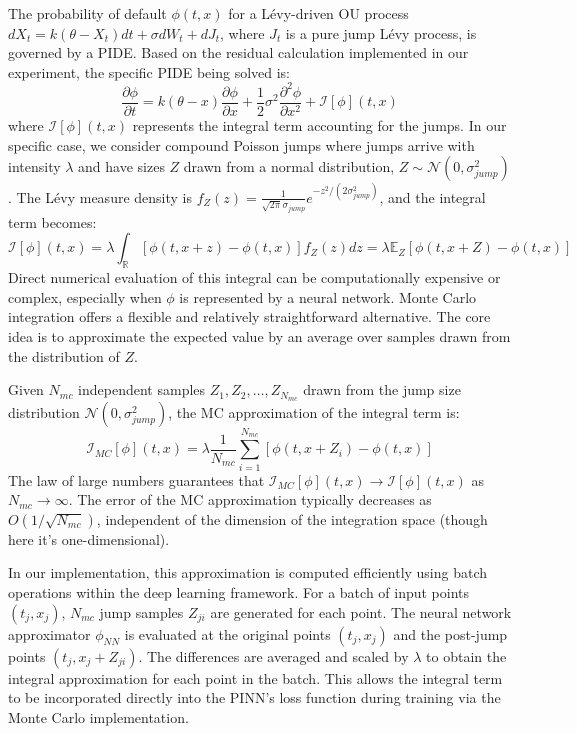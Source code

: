 \documentclass[11pt,twoside,openright]{report}
\begin{document}
The probability of default $\phi(t, x)$ for a Lévy-driven OU process $dX_t = k(\theta - X_t)dt + \sigma dW_t + dJ_t$, where $J_t$ is a pure jump Lévy process, is governed by a PIDE. Based on the residual calculation implemented in our experiment, the specific PIDE being solved is:
$$
\frac{\partial \phi}{\partial t} = k(\theta - x)\frac{\partial \phi}{\partial x} + \frac{1}{2}\sigma^2 \frac{\partial^2 \phi}{\partial x^2} + \mathcal{I}[\phi](t, x)
$$
where $\mathcal{I}[\phi](t, x)$ represents the integral term accounting for the jumps. In our specific case, we consider compound Poisson jumps where jumps arrive with intensity $\lambda$ and have sizes $Z$ drawn from a normal distribution, $Z \sim \mathcal{N}(0, \sigma_{jump}^2)$. The Lévy measure density is $f_Z(z) = \frac{1}{\sqrt{2\pi}\sigma_{jump}} e^{-z^2/(2\sigma_{jump}^2)}$, and the integral term becomes:
$$
\mathcal{I}[\phi](t, x) = \lambda \int_{\mathbb{R}} [\phi(t, x+z) - \phi(t, x)] f_Z(z) dz = \lambda \mathbb{E}_Z[\phi(t, x+Z) - \phi(t, x)]
$$
Direct numerical evaluation of this integral can be computationally expensive or complex, especially when $\phi$ is represented by a neural network. Monte Carlo integration offers a flexible and relatively straightforward alternative. The core idea is to approximate the expected value by an average over samples drawn from the distribution of $Z$.

Given $N_{mc}$ independent samples $Z_1, Z_2, \dots, Z_{N_{mc}}$ drawn from the jump size distribution $\mathcal{N}(0, \sigma_{jump}^2)$, the MC approximation of the integral term is:
$$
\mathcal{I}_{MC}[\phi](t, x) = \lambda \frac{1}{N_{mc}} \sum_{i=1}^{N_{mc}} [\phi(t, x+Z_i) - \phi(t, x)]
$$
The law of large numbers guarantees that $\mathcal{I}_{MC}[\phi](t, x) \to \mathcal{I}[\phi](t, x)$ as $N_{mc} \to \infty$. The error of the MC approximation typically decreases as $O(1/\sqrt{N_{mc}})$, independent of the dimension of the integration space (though here it's one-dimensional).

In our implementation, this approximation is computed efficiently using batch operations within the deep learning framework. For a batch of input points $(t_j, x_j)$, $N_{mc}$ jump samples $Z_{ji}$ are generated for each point. The neural network approximator $\phi_{NN}$ is evaluated at the original points $(t_j, x_j)$ and the post-jump points $(t_j, x_j + Z_{ji})$. The differences are averaged and scaled by $\lambda$ to obtain the integral approximation for each point in the batch. This allows the integral term to be incorporated directly into the PINN's loss function during training via the Monte Carlo implementation.
\end{document}
